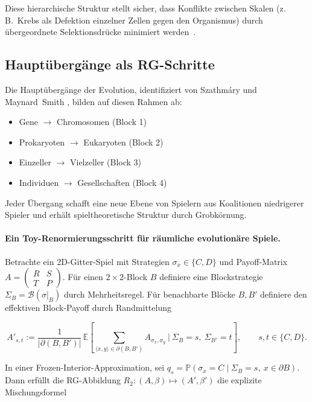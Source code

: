 \documentclass[12pt,a4paper]{article}
\theoremstyle{remark}
\begin{document}
Diese hierarchische Struktur stellt sicher, dass Konflikte zwischen Skalen (z.\,B.\ Krebs als Defektion einzelner Zellen gegen den Organismus) durch übergeordnete Selektionsdrücke minimiert werden~\citep{ReplicatorOptimization}.

\subsection{Hauptübergänge als RG-Schritte}

Die Hauptübergänge der Evolution, identifiziert von Szathmáry und Maynard~Smith \citep{SzathmaryMaynardSmith1995}, bilden auf diesen Rahmen ab:

\begin{itemize}
    \item Gene $\to$ Chromosomen (Block 1)
    \item Prokaryoten $\to$ Eukaryoten (Block 2)
    \item Einzeller $\to$ Vielzeller (Block 3)
    \item Individuen $\to$ Gesellschaften (Block 4)
\end{itemize}

Jeder Übergang schafft eine neue Ebene von \glqq Spielern\grqq{} aus Koalitionen niedrigerer Spieler und erhält spieltheoretische Struktur durch Grobkörnung.

\paragraph{Ein Toy-Renormierungsschritt für räumliche evolutionäre Spiele.}
Betrachte ein 2D-Gitter-Spiel mit Strategien $\sigma_x\in\{C,D\}$ und Payoff-Matrix
$A=\begin{pmatrix}R&S\\ T&P\end{pmatrix}$.
Für einen $2\times 2$-Block $B$ definiere eine Blockstrategie $\Sigma_B=\mathcal B(\sigma|_B)$ durch Mehrheitsregel.
Für benachbarte Blöcke $B,B'$ definiere den effektiven Block-Payoff durch Randmittelung

\[
A'_{s,t}
:=\frac{1}{|\partial(B,B')|}\,
\mathbb E\!\left[\sum_{\langle x,y\rangle\in\partial(B,B')} A_{\sigma_x,\sigma_y}\ \Big|\ \Sigma_B=s,\ \Sigma_{B'}=t\right],
\qquad s,t\in\{C,D\}.
\]

In einer Frozen-Interior-Approximation, sei
$q_s=\mathbb P(\sigma_x=C\mid \Sigma_B=s,\ x\in\partial B)$.
Dann erfüllt die RG-Abbildung $R_2:(A,\beta)\mapsto(A',\beta')$ die explizite Mischungsformel
\end{document}
